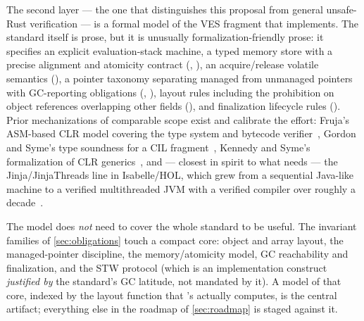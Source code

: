 The second layer --- the one that distinguishes this proposal from
general unsafe-Rust verification --- is a formal model of the VES fragment that \dotnetrs{}
implements. The standard itself is prose, but it is unusually
formalization-friendly prose: it specifies an explicit evaluation-stack
machine, a typed memory store with a precise alignment and atomicity
contract (, ), an acquire/release volatile
semantics (), a pointer taxonomy separating managed from
unmanaged pointers with GC-reporting obligations (,
), layout rules including the prohibition on object
references overlapping other fields (), and finalization
lifecycle rules (). Prior mechanizations of comparable
scope exist and calibrate the effort: Fruja's ASM-based CLR model covering
the type system and bytecode verifier~\cite{fruja2006}, Gordon and Syme's
type soundness for a CIL fragment~\cite{gordonsyme2001}, Kennedy and Syme's
formalization of CLR generics~\cite{kennedysyme2001}, and --- closest in
spirit to what \dotnetrs{} needs --- the Jinja/JinjaThreads line in
Isabelle/HOL, which grew from a sequential Java-like machine to a verified
multithreaded JVM with a verified compiler over roughly a
decade~\cite{jinja2006,jinjathreads2012}.

The model does \emph{not} need to cover the whole standard to be useful.
The invariant families of \cref{sec:obligations} touch a compact core:
object and array layout, the managed-pointer discipline, the memory/atomicity
model, GC reachability and finalization, and the STW protocol (which is an
implementation construct \emph{justified by} the standard's GC latitude, not
mandated by it). A model of that core, indexed by the layout function that
\dotnetrs{}'s  actually computes, is the central
artifact; everything else in the roadmap of \cref{sec:roadmap} is staged
against it.
